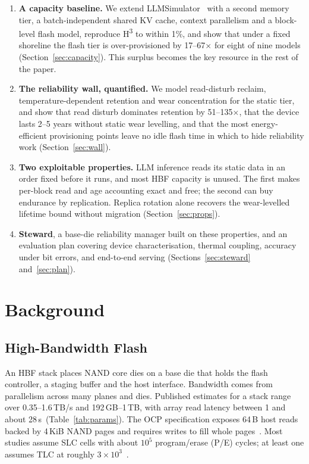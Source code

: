 \documentclass[conference,10pt]{IEEEtran}
\newcommand{\Hthree}{H\textsuperscript{3}}
\newcommand{\sys}{Steward}
\begin{document}
\begin{enumerate}
\item \textbf{A capacity baseline.} We extend LLMSimulator~\cite{yun2024duplex}
with a second memory tier, a batch-independent shared KV cache, context
parallelism and a block-level flash model, reproduce \Hthree{} to within 1\%, and
show that under a fixed shoreline the flash tier is over-provisioned by
17--67$\times$ for eight of nine models (Section~\ref{sec:capacity}). This
surplus becomes the key resource in the rest of the paper.
\item \textbf{The reliability wall, quantified.} We model read-disturb reclaim,
temperature-dependent retention and wear concentration for the static tier, and
show that read disturb dominates retention by 51--135$\times$, that the device
lasts 2--5 years without static wear levelling, and that the most
energy-efficient provisioning points leave no idle flash time in which to hide
reliability work (Section~\ref{sec:wall}).
\item \textbf{Two exploitable properties.} LLM inference reads its static data in
an order fixed before it runs, and most HBF capacity is unused. The first makes
per-block read and age accounting exact and free; the second can buy endurance
by replication. Replica rotation alone recovers the wear-levelled lifetime
bound without migration (Section~\ref{sec:props}).
\item \textbf{\sys{}}, a base-die reliability manager built on these properties,
and an evaluation plan covering device characterisation, thermal coupling,
accuracy under bit errors, and end-to-end serving (Sections~\ref{sec:steward}
and~\ref{sec:plan}).
\end{enumerate}

\section{Background}

\subsection{High-Bandwidth Flash}
An HBF stack places NAND core dies on a base die that holds the flash controller,
a staging buffer and the host interface. Bandwidth comes from parallelism across
many planes and dies. Published estimates for a stack range over 0.35--1.6\,TB/s
and 192\,GB--1\,TB, with array read latency between 1 and about
28\,\textmu{}s~(Table~\ref{tab:params}). The OCP specification exposes 64\,B
host reads backed by 4\,KiB NAND pages and requires writes to fill whole
pages~\cite{ocp2026hbf,li2026hbfsucks}. Most studies assume SLC cells with about
$10^{5}$ program/erase (P/E) cycles; at least one assumes TLC at roughly
$3\times10^{3}$~\cite{li2026hbfsucks}.
\end{document}
